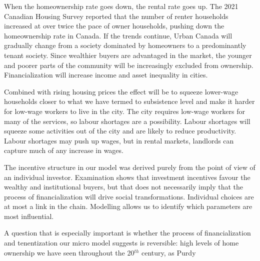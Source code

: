 When the homeownership rate goes down, the rental rate goes up. The 2021 Canadian Housing Survey reported that the number of renter households increased  at over twice the pace of owner households, pushing down the homeownership rate in Canada. If the trends continue, Urban Canada will gradually change from a society dominated by homeowners to a predominantly tenant society. Since wealthier buyers are advantaged in the market, the younger and poorer parts of the community will be increasingly excluded from ownership. Financialization will increase income and asset inequality in cities.

Combined with rising housing prices the effect will be to squeeze lower-wage households closer to what we have termed to subsistence level and make it harder for low-wage workers to live in the city. The city requires low-wage workers for many of the services, so labour shortages are a possibility. Labour shortages will squeeze some activities out of the city and are likely to reduce productivity. Labour shortages may push up wages, but in rental markets, landlords can capture much of any increase in wages. 

The incentive structure in our model was derived purely from the point of view of an individual investor. Examination shows that investment incentives favour the wealthy and institutional buyers, but that does not necessarily imply that the process of financialization will drive social transformations. Individual choices are at most  a link in the chain. Modelling  allows us to identify which parameters are most influential. 

A question that is especially important is whether the process of financialization and tenentization our micro model suggests is reversible:  high levels of home ownership we have seen throughout the 20$^{th}$ century, as Purdy 





